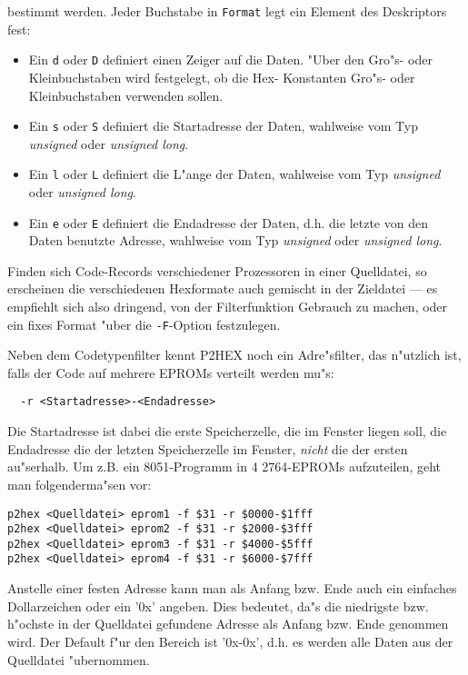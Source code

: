 \documentclass[12pt,a4paper,twoside]{report}
\newcommand{\ii}[1]{{\it #1}}
\begin{document}
bestimmt werden.  Jeder Buchstabe in \verb!Format! legt ein Element des
Deskriptors fest:
\begin{itemize}
\item{Ein \verb!d! oder \verb!D! definiert einen Zeiger auf die Daten.
      "Uber den Gro"s- oder Kleinbuchstaben wird festgelegt, ob die Hex-
      Konstanten Gro"s- oder Kleinbuchstaben verwenden sollen.}
\item{Ein \verb!s! oder \verb!S! definiert die Startadresse der Daten,
      wahlweise vom Typ {\em unsigned} oder {\em unsigned long}.}
\item{Ein \verb!l! oder \verb!L! definiert die L"ange der Daten,
      wahlweise vom Typ {\em unsigned} oder {\em unsigned long}.}
\item{Ein \verb!e! oder \verb!E! definiert die Endadresse der Daten,
      d.h. die letzte von den Daten benutzte Adresse,
      wahlweise vom Typ {\em unsigned} oder {\em unsigned long}.}
\end{itemize}
\par
Finden sich Code-Records verschiedener Prozessoren in einer Quelldatei,
so erscheinen die verschiedenen Hexformate auch gemischt in der Zieldatei
--- es empfiehlt sich also dringend, von der Filterfunktion Gebrauch zu
machen, oder ein fixes Format "uber die \verb!-F!-Option festzulegen.
\par
Neben dem Codetypenfilter kennt P2HEX noch ein Adre"sfilter, das n"utzlich
ist, falls der Code auf mehrere EPROMs verteilt werden mu"s:
\begin{verbatim}
  -r <Startadresse>-<Endadresse>
\end{verbatim}
Die Startadresse ist dabei die erste Speicherzelle, die im Fenster liegen
soll, die Endadresse die der letzten Speicherzelle im Fenster, \ii{nicht}
die der ersten au"serhalb.  Um z.B. ein 8051-Programm in 4 2764-EPROMs
aufzuteilen, geht man folgenderma"sen vor:
\begin{verbatim}
p2hex <Quelldatei> eprom1 -f $31 -r $0000-$1fff
p2hex <Quelldatei> eprom2 -f $31 -r $2000-$3fff
p2hex <Quelldatei> eprom3 -f $31 -r $4000-$5fff
p2hex <Quelldatei> eprom4 -f $31 -r $6000-$7fff
\end{verbatim}
Anstelle einer festen Adresse kann man als Anfang bzw. Ende auch ein
einfaches Dollarzeichen oder ein '0x' angeben.  Dies bedeutet, da"s die
niedrigste bzw. h"ochste in der Quelldatei gefundene Adresse als Anfang
bzw. Ende genommen wird.  Der Default f"ur den Bereich ist '0x-0x', d.h.
es werden alle Daten aus der Quelldatei "ubernommen.
\par
\end{document}
